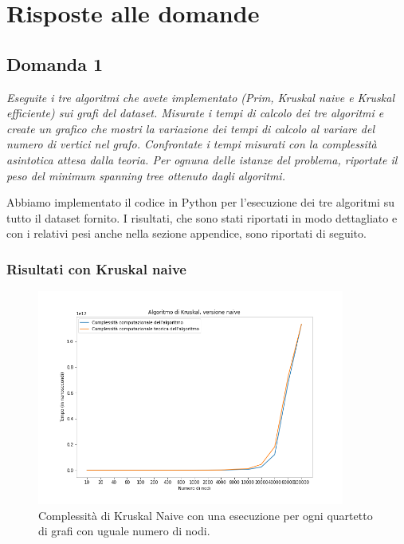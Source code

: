 \section{Risposte alle domande}

\subsection{Domanda 1}

\textit{Eseguite i tre algoritmi che avete implementato (Prim, Kruskal naive e
Kruskal efficiente) sui grafi del dataset. Misurate i tempi di calcolo dei tre algoritmi e
create un grafico che mostri la variazione dei tempi di calcolo al variare del numero di
vertici nel grafo. Confrontate i tempi misurati con la complessità asintotica attesa dalla
teoria. Per ognuna delle istanze del problema, riportate il peso del minimum spanning tree
ottenuto dagli algoritmi.}

Abbiamo implementato il codice in Python per l'esecuzione dei tre algoritmi su tutto il dataset fornito. I risultati, che sono stati riportati in modo dettagliato e con i relativi pesi anche nella sezione appendice, sono riportati di seguito.

\subsubsection{Risultati con Kruskal naive}


\begin{figure}[H]
	\centering
	\includegraphics[width=0.9\textwidth]{res/images/graph-no-rep/kruskal_naive_senza_ripetizioni.png}
    \caption{Complessità di Kruskal Naive con una esecuzione per ogni quartetto di grafi con uguale numero di nodi.}
	\label{fig:kruskalnr}
\end{figure}

